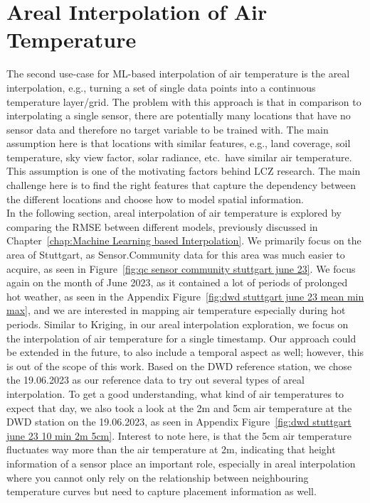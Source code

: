 \section{Areal Interpolation of Air Temperature}

The second use-case for ML-based interpolation of air temperature is the areal interpolation, e.g., turning a set of single data points into a continuous temperature layer/grid. The problem with this approach is that in comparison to interpolating a single sensor, there are potentially many locations that have no sensor data and therefore no target variable to be trained with. The main assumption here is that locations with similar features, e.g., land coverage, soil temperature, sky view factor, solar radiance, etc.\ have similar air temperature. This assumption is one of the motivating factors behind LCZ research. The main challenge here is to find the right features that capture the dependency between the different locations and choose how to model spatial information.\\
In the following section, areal interpolation of air temperature is explored by comparing the RMSE between different models, previously discussed in Chapter~\ref{chap:Machine Learning based Interpolation}. We primarily focus on the area of Stuttgart, as Sensor.Community data for this area was much easier to acquire, as seen in Figure~\ref{fig:qc sensor community stuttgart june 23}. We focus again on the month of June 2023, as it contained a lot of periods of prolonged hot weather, as seen in the Appendix Figure~\ref{fig:dwd stuttgart june 23 mean min max}, and we are interested in mapping air temperature especially during hot periods. Similar to Kriging, in our areal interpolation exploration, we focus on the interpolation of air temperature for a single timestamp. Our approach could be extended in the future, to also include a temporal aspect as well; however, this is out of the scope of this work. Based on the DWD reference station, we chose the 19.06.2023 as our reference data to try out several types of areal interpolation. To get a good understanding, what kind of air temperatures to expect that day, we also took a look at the 2m and 5cm air temperature at the DWD station on the 19.06.2023, as seen in Appendix Figure~\ref{fig:dwd stuttgart june 23 10 min 2m 5cm}. Interest to note here, is that the 5cm air temperature fluctuates way more than the air temperature at 2m, indicating that height information of a sensor place an important role, especially in areal interpolation where you cannot only rely on the relationship between neighbouring temperature curves but need to capture placement information as well.\\

